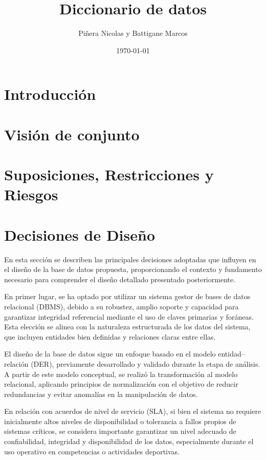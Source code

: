 \documentclass[12pt]{article}
\title{Diccionario de datos}
\date{\today}
\author{Piñera Nicolas y Battigane Marcos}
\begin{document}
	
	\maketitle
	
	\tableofcontents
	\newpage
	
	\section{Introducción}
	
	
	\section{Visión de conjunto}
	
	
	\section{Suposiciones, Restricciones y Riesgos}
	
	
	\section{Decisiones de Diseño}
	
	En esta sección se describen las principales decisiones adoptadas que influyen en el diseño de la base de datos propuesta, proporcionando el contexto y fundamento necesario para comprender el diseño detallado presentado posteriormente.
	
	En primer lugar, se ha optado por utilizar un sistema gestor de bases de datos relacional (DBMS), debido a su robustez, amplio soporte y capacidad para garantizar integridad referencial mediante el uso de claves primarias y foráneas. Esta elección se alinea con la naturaleza estructurada de los datos del sistema, que incluyen entidades bien definidas y relaciones claras entre ellas.
	
	El diseño de la base de datos sigue un enfoque basado en el modelo entidad–relación (DER), previamente desarrollado y validado durante la etapa de análisis. A partir de este modelo conceptual, se realizó la transformación al modelo relacional, aplicando principios de normalización con el objetivo de reducir redundancias y evitar anomalías en la manipulación de datos.
	
	En relación con acuerdos de nivel de servicio (SLA), si bien el sistema no requiere inicialmente altos niveles de disponibilidad o tolerancia a fallos propios de sistemas críticos, se considera importante garantizar un nivel adecuado de confiabilidad, integridad y disponibilidad de los datos, especialmente durante el uso operativo en competencias o actividades deportivas.
	
\end{document}
